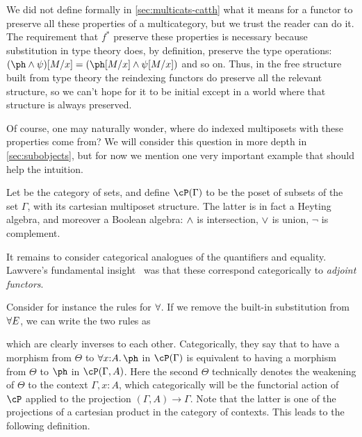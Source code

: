 We did not define formally in \cref{sec:multicats-catth} what it means for a functor to preserve all these properties of a multicategory, but we trust the reader can do it.
The requirement that $f^*$ preserve these properties is necessary because substitution in type theory does, by definition, preserve the type operations: $(\ph\meet\psi)[M/x] = (\ph[M/x] \meet \psi[M/x])$ and so on.
Thus, in the free structure built from type theory the reindexing functors do preserve all the relevant structure, so we can't hope for it to be initial except in a world where that structure is always preserved.

Of course, one may naturally wonder, where do indexed multiposets with these properties come from?
We will consider this question in more depth in \cref{sec:subobjects}, but for now we mention one very important example that should help the intuition.

\begin{eg}
  Let \cS be the category of sets, and define $\cP(\Gamma)$ to be the poset of subsets of the set $\Gamma$, with its cartesian multiposet structure.
  The latter is in fact a Heyting algebra, and moreover a Boolean algebra: $\wedge$ is intersection, $\vee$ is union, $\neg$ is complement.
\end{eg}

It remains to consider categorical analogues of the quantifiers and equality.
Lawvere's fundamental insight~\cite{lawvere:adjointness,lawvere:comprehension} was that these correspond categorically to \emph{adjoint functors}.

Consider for instance the rules for $\all$.
If we remove the built-in substitution from $\forallE$, we can write the two rules as
which are clearly inverses to each other.
Categorically, they say that to have a morphism from $\Theta$ to $\forall x:A.\ph$ in $\cP(\Gamma)$ is equivalent to having a morphism from $\Theta$ to $\ph$ in $\cP(\Gamma,A)$.
Here the second $\Theta$ technically denotes the weakening of $\Theta$ to the context $\Gamma,x:A$, which categorically will be the functorial action of $\cP$ applied to the projection $(\Gamma,A)\to \Gamma$.
Note that the latter is one of the projections of a cartesian product in the category of contexts.
This leads to the following definition.

